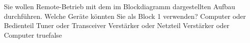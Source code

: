     {Sie wollen Remote-Betrieb mit dem im Blockdiagramm dargestellten Aufbau durchführen. Welche Geräte könnten Sie als Block 1 verwenden?}
    {Computer oder Bedienteil}
    {Tuner oder Transceiver}
    {Verstärker oder Netzteil}
    {Verstärker oder Computer}
    {true}{false}